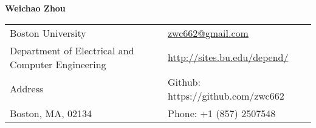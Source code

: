 \documentclass[letterpaper,11pt,oneside]{article}
\begin{document}

\noindent  \LARGE{\textbf{Weichao Zhou}}  \\
\vspace{-2ex}
\hrulefill
\normalsize
\newline

\begin{center}
\begin{tabular}{l l}
 Boston University    & \hspace{0.2in} \href{mailto:zwc662@gmail.com}{zwc662@gmail.com} \\
 Department of Electrical and Computer Engineering    & \hspace{0.2in}  \href{http://sites.bu.edu/depend/}{http://sites.bu.edu/depend/}   \\
 Address             & \hspace{0.2in} Github: https://github.com/zwc662  \\
 Boston, MA, 02134 & \hspace{0.2in} Phone: +1 (857) 2507548 \\
\end{tabular}
\end{center}

\vspace{1em}

\end{document}
